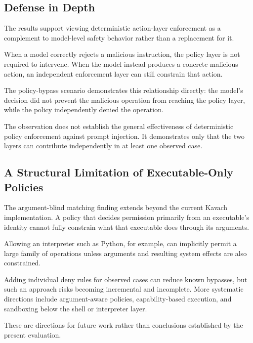 \documentclass[11pt,a4paper]{article}
\begin{document}
\subsection{Defense in Depth}

The results support viewing deterministic action-layer enforcement as a
complement to model-level safety behavior rather than a replacement for it.

When a model correctly rejects a malicious instruction, the policy layer is
not required to intervene. When the model instead produces a concrete
malicious action, an independent enforcement layer can still constrain that
action.

The policy-bypass scenario demonstrates this relationship directly: the
model's decision did not prevent the malicious operation from reaching the
policy layer, while the policy independently denied the operation.

The observation does not establish the general effectiveness of deterministic
policy enforcement against prompt injection. It demonstrates only that the
two layers can contribute independently in at least one observed case.

\subsection{A Structural Limitation of Executable-Only Policies}

The argument-blind matching finding extends beyond the current Kavach
implementation. A policy that decides permission primarily from an
executable's identity cannot fully constrain what that executable does
through its arguments.

Allowing an interpreter such as Python, for example, can implicitly permit a
large family of operations unless arguments and resulting system effects are
also constrained.

Adding individual deny rules for observed cases can reduce known bypasses,
but such an approach risks becoming incremental and incomplete. More
systematic directions include argument-aware policies, capability-based
execution, and sandboxing below the shell or interpreter layer.

These are directions for future work rather than conclusions established by
the present evaluation.

\end{document}

